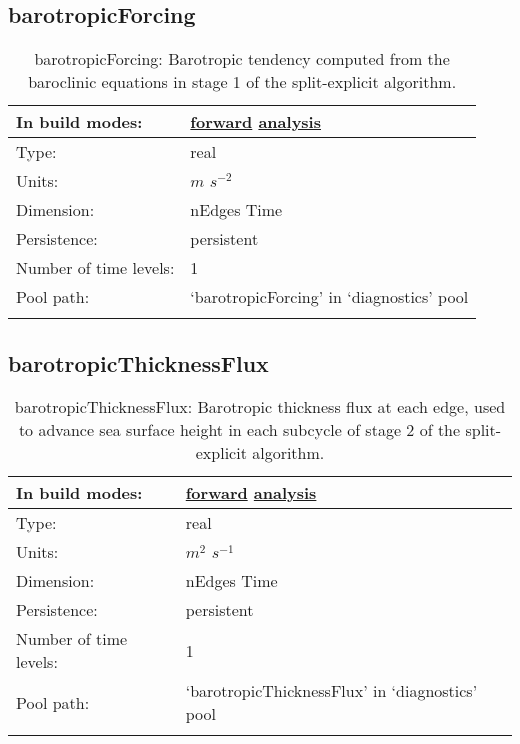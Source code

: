 \subsection[barotropicForcing]{barotropicForcing}
\label{subsec:var_sec_diagnostics_barotropicForcing}
\begin{center}
\begin{longtable}{| p{2.0in} | p{4.0in} |}
        \hline 
        In build modes: & \hyperref[subsec:forward_var_tab_diagnostics]{forward} \hyperref[subsec:analysis_var_tab_diagnostics]{analysis} \\
        \hline 
        Type: & real \\
        \hline 
        Units: & $m$ $s^{-2}$ \\
        \hline 
        Dimension: & nEdges Time \\
        \hline 
        Persistence: & persistent \\
        \hline 
        Number of time levels: & 1 \\
        \hline 
            Pool path: & `barotropicForcing' in `diagnostics' pool \\
		 \hline 
    \caption{barotropicForcing: Barotropic tendency computed from the baroclinic equations in stage 1 of the split-explicit algorithm.}
\end{longtable}
\end{center}
\subsection[barotropicThicknessFlux]{barotropicThicknessFlux}
\label{subsec:var_sec_diagnostics_barotropicThicknessFlux}
\begin{center}
\begin{longtable}{| p{2.0in} | p{4.0in} |}
        \hline 
        In build modes: & \hyperref[subsec:forward_var_tab_diagnostics]{forward} \hyperref[subsec:analysis_var_tab_diagnostics]{analysis} \\
        \hline 
        Type: & real \\
        \hline 
        Units: & $m^2$ $s^{-1}$ \\
        \hline 
        Dimension: & nEdges Time \\
        \hline 
        Persistence: & persistent \\
        \hline 
        Number of time levels: & 1 \\
        \hline 
            Pool path: & `barotropicThicknessFlux' in `diagnostics' pool \\
		 \hline 
    \caption{barotropicThicknessFlux: Barotropic thickness flux at each edge, used to advance sea surface height in each subcycle of stage 2 of the split-explicit algorithm.}
\end{longtable}
\end{center}
